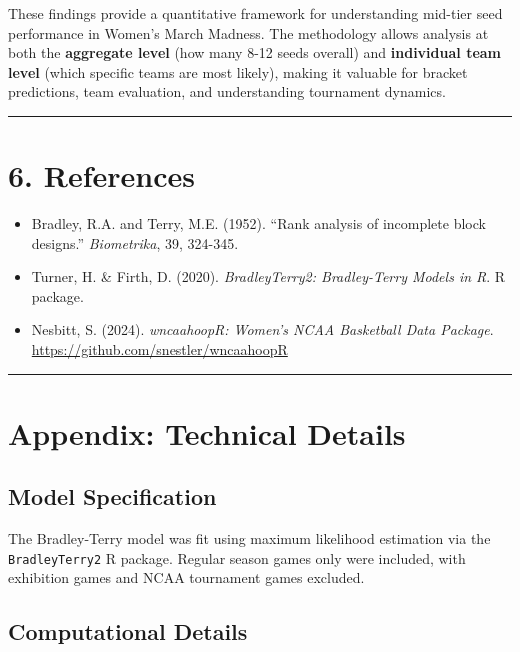 \documentclass[
]{article}
\providecommand{\tightlist}{%
  \setlength{\itemsep}{0pt}\setlength{\parskip}{0pt}}
\begin{document}
These findings provide a quantitative framework for understanding
mid-tier seed performance in Women's March Madness. The methodology
allows analysis at both the \textbf{aggregate level} (how many 8-12
seeds overall) and \textbf{individual team level} (which specific teams
are most likely), making it valuable for bracket predictions, team
evaluation, and understanding tournament dynamics.

\begin{center}\rule{0.5\linewidth}{0.5pt}\end{center}

\section{6. References}\label{references}

\begin{itemize}
\tightlist
\item
  Bradley, R.A. and Terry, M.E. (1952). ``Rank analysis of incomplete
  block designs.'' \emph{Biometrika}, 39, 324-345.
\item
  Turner, H. \& Firth, D. (2020). \emph{BradleyTerry2: Bradley-Terry
  Models in R}. R package.
\item
  Nesbitt, S. (2024). \emph{wncaahoopR: Women's NCAA Basketball Data
  Package}. \url{https://github.com/snestler/wncaahoopR}
\end{itemize}

\begin{center}\rule{0.5\linewidth}{0.5pt}\end{center}

\section{Appendix: Technical Details}\label{appendix-technical-details}

\subsection{Model Specification}\label{model-specification}

The Bradley-Terry model was fit using maximum likelihood estimation via
the \texttt{BradleyTerry2} R package. Regular season games only were
included, with exhibition games and NCAA tournament games excluded.

\subsection{Computational Details}\label{computational-details}
\end{document}
